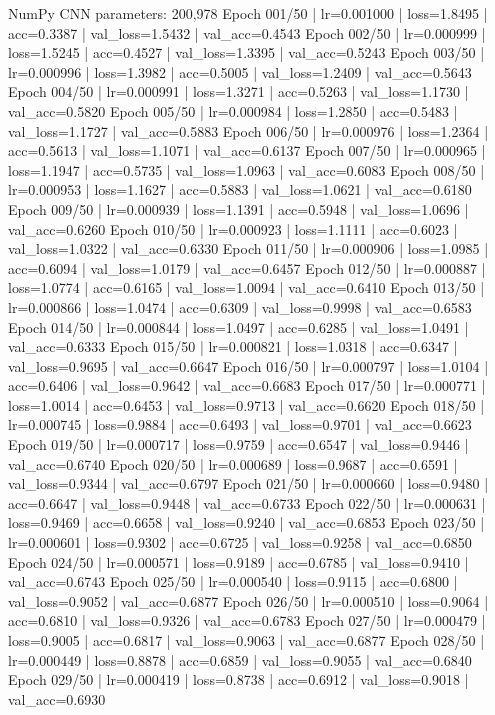 \documentclass[12pt,a4paper]{report}
\begin{document}
\begin{NotebookOutput}
NumPy CNN parameters: 200,978
Epoch 001/50 | lr=0.001000 | loss=1.8495 | acc=0.3387 | val_loss=1.5432 | val_acc=0.4543
Epoch 002/50 | lr=0.000999 | loss=1.5245 | acc=0.4527 | val_loss=1.3395 | val_acc=0.5243
Epoch 003/50 | lr=0.000996 | loss=1.3982 | acc=0.5005 | val_loss=1.2409 | val_acc=0.5643
Epoch 004/50 | lr=0.000991 | loss=1.3271 | acc=0.5263 | val_loss=1.1730 | val_acc=0.5820
Epoch 005/50 | lr=0.000984 | loss=1.2850 | acc=0.5483 | val_loss=1.1727 | val_acc=0.5883
Epoch 006/50 | lr=0.000976 | loss=1.2364 | acc=0.5613 | val_loss=1.1071 | val_acc=0.6137
Epoch 007/50 | lr=0.000965 | loss=1.1947 | acc=0.5735 | val_loss=1.0963 | val_acc=0.6083
Epoch 008/50 | lr=0.000953 | loss=1.1627 | acc=0.5883 | val_loss=1.0621 | val_acc=0.6180
Epoch 009/50 | lr=0.000939 | loss=1.1391 | acc=0.5948 | val_loss=1.0696 | val_acc=0.6260
Epoch 010/50 | lr=0.000923 | loss=1.1111 | acc=0.6023 | val_loss=1.0322 | val_acc=0.6330
Epoch 011/50 | lr=0.000906 | loss=1.0985 | acc=0.6094 | val_loss=1.0179 | val_acc=0.6457
Epoch 012/50 | lr=0.000887 | loss=1.0774 | acc=0.6165 | val_loss=1.0094 | val_acc=0.6410
Epoch 013/50 | lr=0.000866 | loss=1.0474 | acc=0.6309 | val_loss=0.9998 | val_acc=0.6583
Epoch 014/50 | lr=0.000844 | loss=1.0497 | acc=0.6285 | val_loss=1.0491 | val_acc=0.6333
Epoch 015/50 | lr=0.000821 | loss=1.0318 | acc=0.6347 | val_loss=0.9695 | val_acc=0.6647
Epoch 016/50 | lr=0.000797 | loss=1.0104 | acc=0.6406 | val_loss=0.9642 | val_acc=0.6683
Epoch 017/50 | lr=0.000771 | loss=1.0014 | acc=0.6453 | val_loss=0.9713 | val_acc=0.6620
Epoch 018/50 | lr=0.000745 | loss=0.9884 | acc=0.6493 | val_loss=0.9701 | val_acc=0.6623
Epoch 019/50 | lr=0.000717 | loss=0.9759 | acc=0.6547 | val_loss=0.9446 | val_acc=0.6740
Epoch 020/50 | lr=0.000689 | loss=0.9687 | acc=0.6591 | val_loss=0.9344 | val_acc=0.6797
Epoch 021/50 | lr=0.000660 | loss=0.9480 | acc=0.6647 | val_loss=0.9448 | val_acc=0.6733
Epoch 022/50 | lr=0.000631 | loss=0.9469 | acc=0.6658 | val_loss=0.9240 | val_acc=0.6853
Epoch 023/50 | lr=0.000601 | loss=0.9302 | acc=0.6725 | val_loss=0.9258 | val_acc=0.6850
Epoch 024/50 | lr=0.000571 | loss=0.9189 | acc=0.6785 | val_loss=0.9410 | val_acc=0.6743
Epoch 025/50 | lr=0.000540 | loss=0.9115 | acc=0.6800 | val_loss=0.9052 | val_acc=0.6877
Epoch 026/50 | lr=0.000510 | loss=0.9064 | acc=0.6810 | val_loss=0.9326 | val_acc=0.6783
Epoch 027/50 | lr=0.000479 | loss=0.9005 | acc=0.6817 | val_loss=0.9063 | val_acc=0.6877
Epoch 028/50 | lr=0.000449 | loss=0.8878 | acc=0.6859 | val_loss=0.9055 | val_acc=0.6840
Epoch 029/50 | lr=0.000419 | loss=0.8738 | acc=0.6912 | val_loss=0.9018 | val_acc=0.6930

\end{NotebookOutput}
\end{document}
